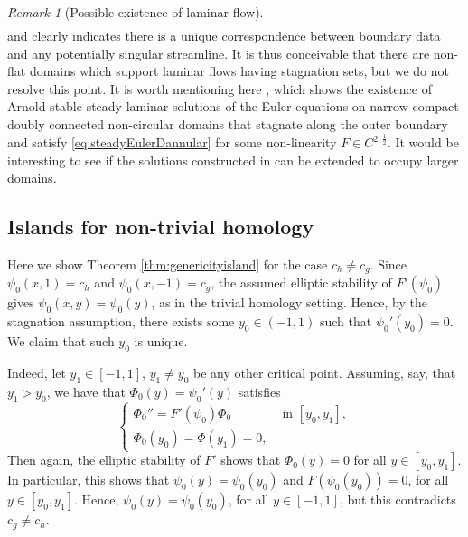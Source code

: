 \documentclass[11pt,reqno]{amsproc}
\numberwithin{equation}{section}
\numberwithin{theorem}{section}
\numberwithin{prop}{section}
\numberwithin{cor}{section}
\numberwithin{lemma}{section}
\theoremstyle{remark}
\newtheorem*{remark}{Remark}
\theoremstyle{definition}
\begin{document}
\begin{remark}[Possible existence of laminar flow]
\begin{align*}
\end{align*}
and clearly indicates there is a unique correspondence between boundary data and any potentially singular streamline. It is thus conceivable that there are non-flat domains which support laminar flows having stagnation sets, but we do not resolve this point. {It is worth mentioning here \cite[Theorem 4.12]{elgindi2024classification}, which shows the existence of Arnold stable steady laminar solutions of the Euler equations on narrow compact doubly connected non-circular domains that stagnate along the outer boundary and satisfy \eqref{eq:steadyEulerDannular} for some non-linearity $F\in C^{2,\frac12}$. It would be interesting to see if the solutions constructed in \cite{elgindi2024classification} can be extended to occupy larger domains.}
\end{remark}

\subsection{Islands for non-trivial homology}
Here we show Theorem \ref{thm:genericityisland} for the case $c_h\neq c_g$. Since $\psi_0(x,1)=c_h$ and $\psi_0(x,-1)=c_g$, the assumed elliptic stability of $F'(\psi_0)$ gives $\psi_0(x,y)=\psi_0(y)$, as in the trivial homology setting. Hence, by the stagnation assumption, there exists some $y_0\in (-1,1)$ such that $\psi_0'(y_0)=0$. We claim that such $y_0$ is unique.

Indeed, let $y_1\in [-1,1]$, $y_1\neq y_0$ be any other critical point. Assuming, say, that $y_1>y_0$, we have that $\Phi_0(y) = \psi_0'(y)$ satisfies
\begin{equation}
\begin{cases}
\Phi_0'' = F'(\psi_0)\Phi_0 & \text{ in } [y_0,y_1], \\
\Phi_0(y_0)=\Phi(y_1)=0, & 
\end{cases}
\end{equation}
Then again, the elliptic stability of $F'$ shows that $\Phi_0(y)=0$ for all $y\in [y_0,y_1]$. In particular, this shows that $\psi_0(y) = \psi_0(y_0)$ and $F(\psi_0(y_0))=0$, for all $y\in [y_0,y_1]$. Hence, $\psi_0(y)=\psi_0(y_0)$, for all $y\in [-1,1]$, but this contradicts $c_g\neq c_h$.
\end{document}
